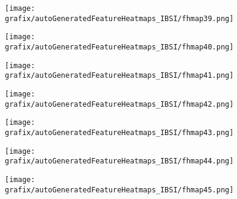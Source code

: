\hspace{\hsp} 
\begin{subfigure}{\wid\textwidth} 
    \centering 
    \caption{\tiny \sffamily {}} 
    \vspace{\vsp} 
    \texttt{[image: grafix/autoGeneratedFeatureHeatmaps\_IBSI/fhmap39.png]} 
\end{subfigure} 
\hspace{\hsp} 
\begin{subfigure}{\wid\textwidth} 
    \centering 
    \caption{\tiny \sffamily {}} 
    \vspace{\vsp} 
    \texttt{[image: grafix/autoGeneratedFeatureHeatmaps\_IBSI/fhmap40.png]} 
\end{subfigure} 
\hspace{\hsp} 
\begin{subfigure}{\wid\textwidth} 
    \centering 
    \caption{\tiny \sffamily {}} 
    \vspace{\vsp} 
    \texttt{[image: grafix/autoGeneratedFeatureHeatmaps\_IBSI/fhmap41.png]} 
\end{subfigure} 
\hspace{\hsp} 
\begin{subfigure}{\wid\textwidth} 
    \centering 
    \caption{\tiny \sffamily {}} 
    \vspace{\vsp} 
    \texttt{[image: grafix/autoGeneratedFeatureHeatmaps\_IBSI/fhmap42.png]} 
\end{subfigure} 
\hspace{\hsp} 
\begin{subfigure}{\wid\textwidth} 
    \centering 
    \caption{\tiny \sffamily {}} 
    \vspace{\vsp} 
    \texttt{[image: grafix/autoGeneratedFeatureHeatmaps\_IBSI/fhmap43.png]} 
\end{subfigure} 
\hspace{\hsp} 
\begin{subfigure}{\wid\textwidth} 
    \centering 
    \caption{\tiny \sffamily {}} 
    \vspace{\vsp} 
    \texttt{[image: grafix/autoGeneratedFeatureHeatmaps\_IBSI/fhmap44.png]} 
\end{subfigure} 
\hspace{\hsp} 
\begin{subfigure}{\wid\textwidth} 
    \centering 
    \caption{\tiny \sffamily {}} 
    \vspace{\vsp} 
    \texttt{[image: grafix/autoGeneratedFeatureHeatmaps\_IBSI/fhmap45.png]} 
\end{subfigure} 
